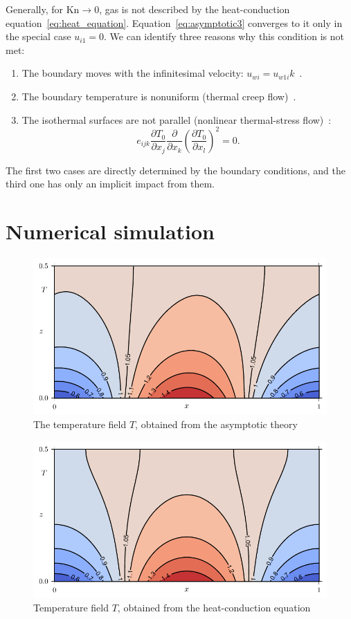 \documentclass[smallextended, referee]{svjour3} %
\newcommand{\Kn}{\mathrm{Kn}}
\newcommand{\pder}[2][]{\frac{\partial#1}{\partial#2}}
\begin{document}
Generally, for \(\Kn\to0\), gas is not described by the heat-conduction equation~\eqref{eq:heat_equation}.
Equation~\eqref{eq:asymptotic3} converges to it only in the special case \(u_{i1} = 0\).
We can identify three reasons why this condition is not met:
\begin{enumerate}
	\item The boundary moves with the infinitesimal velocity: \(u_{wi} = u_{w1i} k\)~\cite{GhostEffect}.
	\item The boundary temperature is nonuniform (thermal creep flow)~\cite{Bobylev1996}.
	\item The isothermal surfaces are not parallel (nonlinear thermal-stress flow)~\cite{Kogan1976}:
		\begin{equation}\label{eq:equilibrium}
			e_{ijk}\pder[T_0]{x_j}\pder{x_k}\left(\pder[T_0]{x_l}\right)^2 = 0.
		\end{equation}
\end{enumerate}

The first two cases are directly determined by the boundary conditions,
and the third one has only an implicit impact from them.

\section{Numerical simulation}

\begin{figure}[ht]
	\centering
	\includegraphics{Fig3}
	\caption{The temperature field \(T\), obtained from the asymptotic theory}
	\label{fig:moving:T_asym}
\end{figure}

\begin{figure}[ht]
	\centering
	\includegraphics{Fig4}
	\caption{Temperature field \(T\), obtained from the heat-conduction equation}
	\label{fig:moving:T_heat}
\end{figure}
\end{document}
